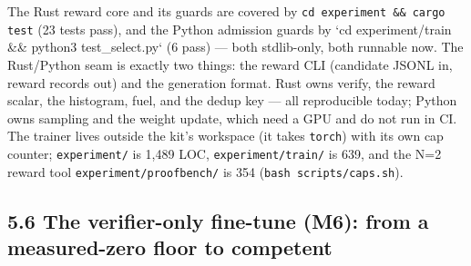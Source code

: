 \documentclass[11pt]{article}
\newcommand{\code}[1]{\texttt{#1}}
\begin{document}
The Rust reward core and its guards are covered by \code{cd experiment \&\& cargo test}
(23 tests pass), and the Python admission guards by `cd experiment/train \&\&
python3 test\_select.py` (6 pass) --- both stdlib-only, both runnable now. The
Rust/Python seam is exactly two things: the reward CLI (candidate JSONL in,
reward records out) and the generation format. Rust owns verify, the reward
scalar, the histogram, fuel, and the dedup key --- all reproducible today; Python
owns sampling and the weight update, which need a GPU and do not run in CI. The
trainer lives outside the kit's workspace (it takes \code{torch}) with its own cap
counter; \code{experiment/} is 1,489 LOC, \code{experiment/train/} is 639, and the N=2 reward tool
\code{experiment/proofbench/} is 354 (\code{bash scripts/caps.sh}).

\subsection*{5.6 The verifier-only fine-tune (M6): from a measured-zero floor to competent}
\end{document}
